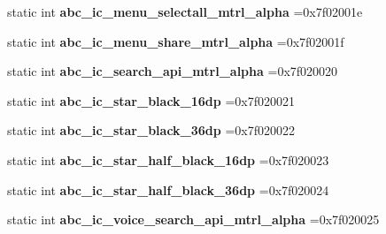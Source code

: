 \begin{DoxyCompactItemize}
\item 
\mbox{\label{classandroid_1_1support_1_1v4_1_1R_1_1drawable_a8a09e2cb4d7ffaff219f38b150530726}} 
static int {\bfseries abc\+\_\+ic\+\_\+menu\+\_\+selectall\+\_\+mtrl\+\_\+alpha} =0x7f02001e
\item 
\mbox{\label{classandroid_1_1support_1_1v4_1_1R_1_1drawable_a232afacc3370b5ba3d21ae82beb8cf44}} 
static int {\bfseries abc\+\_\+ic\+\_\+menu\+\_\+share\+\_\+mtrl\+\_\+alpha} =0x7f02001f
\item 
\mbox{\label{classandroid_1_1support_1_1v4_1_1R_1_1drawable_a7d3d73f0a3bd8d4209da8cae555516c0}} 
static int {\bfseries abc\+\_\+ic\+\_\+search\+\_\+api\+\_\+mtrl\+\_\+alpha} =0x7f020020
\item 
\mbox{\label{classandroid_1_1support_1_1v4_1_1R_1_1drawable_a3f72ca456f6f9ee99a35e1a3ad82c051}} 
static int {\bfseries abc\+\_\+ic\+\_\+star\+\_\+black\+\_\+16dp} =0x7f020021
\item 
\mbox{\label{classandroid_1_1support_1_1v4_1_1R_1_1drawable_a3e1ab42efb11d3c934d4e6b8ec72773e}} 
static int {\bfseries abc\+\_\+ic\+\_\+star\+\_\+black\+\_\+36dp} =0x7f020022
\item 
\mbox{\label{classandroid_1_1support_1_1v4_1_1R_1_1drawable_a8787ef7656bb6b043d502afc7ccbaf78}} 
static int {\bfseries abc\+\_\+ic\+\_\+star\+\_\+half\+\_\+black\+\_\+16dp} =0x7f020023
\item 
\mbox{\label{classandroid_1_1support_1_1v4_1_1R_1_1drawable_a1c0e8b828afae108f89ff37e842522a2}} 
static int {\bfseries abc\+\_\+ic\+\_\+star\+\_\+half\+\_\+black\+\_\+36dp} =0x7f020024
\item 
\mbox{\label{classandroid_1_1support_1_1v4_1_1R_1_1drawable_aa472204471f75c4c238c6c6f5b46fb27}} 
static int {\bfseries abc\+\_\+ic\+\_\+voice\+\_\+search\+\_\+api\+\_\+mtrl\+\_\+alpha} =0x7f020025

\end{DoxyCompactItemize}
